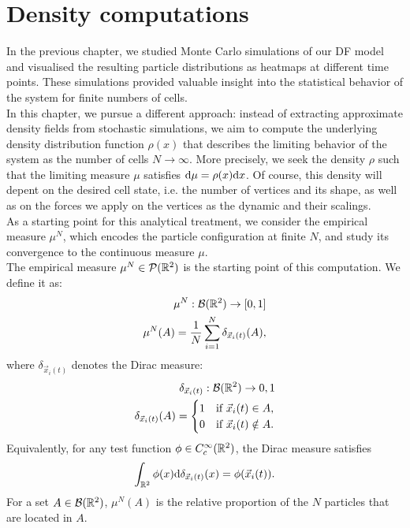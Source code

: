 \section{Density computations}
In the previous chapter, we studied Monte Carlo simulations of our DF model and visualised the resulting particle distributions as heatmaps at different time points. 
These simulations provided valuable insight into the statistical behavior of the system for finite numbers of cells. \\
In this chapter, we pursue a different approach: instead of extracting approximate density fields from stochastic simulations, we aim to compute the underlying density distribution function \( \rho(x) \) that describes the limiting behavior of the system as the number of cells \( N \to \infty \). 
More precisely, we seek the density \( \rho \) such that the limiting measure \( \mu \) satisfies \( \mathrm{d} \mu = \rho(x) \mathrm{d} x \). 
Of course, this density will depent on the desired cell state, i.e. the number of vertices and its shape, as well as on the forces we apply on the vertices as the dynamic and their scalings. \\ 
As a starting point for this analytical treatment, we consider the empirical measure \( \mu^N \), which encodes the particle configuration at finite \( N \), and study its convergence to the continuous measure \( \mu \). \\
The empirical measure $\mu^N \in \mathcal{P}(\mathbb{R}^{2})$ is the starting point of this computation. 
We define it as:  
\begin{align*}
    \mu^{N}: \mathcal{B}(\mathbb{R}^2) \rightarrow [0,1]  \\
    \mu^{N}(A) = \frac{1}{N} \sum\limits_{i=1}^{N} \delta_{\vec{x}_i(t)}(A),
\end{align*}
where \( \delta_{\vec{x}_i(t)} \) denotes the Dirac measure: 
\begin{align*}
    \delta_{\vec{x}_i(t)}: \mathcal{B}(\mathbb{R}^2) \rightarrow {0,1}  \\
    \delta_{\vec{x}_i(t)}(A) = \begin{cases}
        1 & \text{if } \vec{x}_i(t) \in A, \\
        0 & \text{if } \vec{x}_i(t) \notin A.
   \end{cases}
\end{align*}
Equivalently, for any test function \( \phi \in C_c^\infty(\mathbb{R}^2) \), the Dirac measure satisfies
\[
\int_{\mathbb{R}^2} \phi(x) \mathrm{d} \delta_{\vec{x}_i(t)}(x) = \phi(\vec{x}_i(t)).
\]
For a set $A \in \mathcal{B}(\mathbb{R}^2)$, $\mu^{N}(A)$ is the relative proportion of the $N$ particles that are located in $A$. \\
